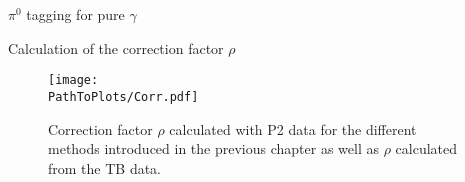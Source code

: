 \documentclass[ALICE]{ALICE_analysis_notes}
\newcommand{\PZ}{$\pi^0$\xspace}
\newcommand{\g}{$\gamma$\xspace}
\newcommand{\PathToPlots}{/home/joshua/PCG_Software/EMCal_NCellEffi/13TeVNomB_Wide/Pi0Tagging_13TeV_nom_04_26_WithTRD_WithBorderCells_1cellFT/pdf}
\begin{document}
\begin{section}{\PZ tagging for pure \g}
\begin{section}{Calculation of the correction factor $\rho$}
	
	
	
	
	
	
	\begin{figure}[t]
		\centering
		\texttt{[image: \\PathToPlots/Corr.pdf]}
		\caption{Correction factor $\rho$ calculated with P2 data for the different methods introduced in the previous chapter as well as $\rho$ calculated from the TB data. }
		\label{fig:NCells_Rho}
	\end{figure}
	



\end{section}
\end{section}
\end{document}
